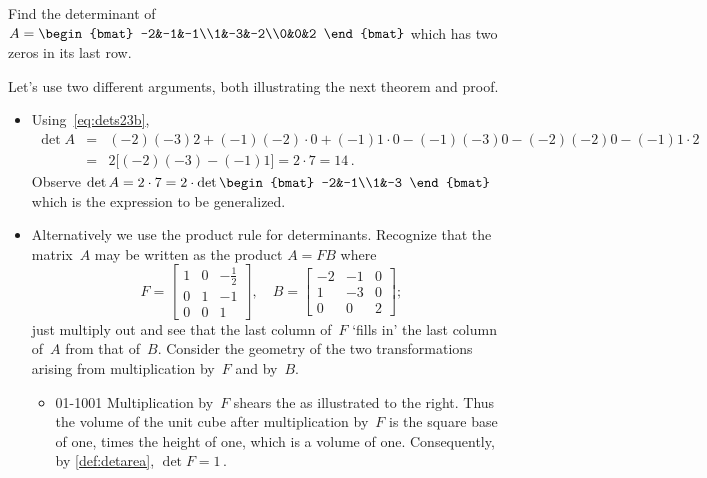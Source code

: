 \begin{example} 
Find the determinant of 
\(A=\begin{bmat} -2&-1&-1\\1&-3&-2\\0&0&2 \end{bmat}\)
which has two zeros in its last row.
\begin{solution} Let's use two different arguments, both illustrating the next theorem and proof.
\begin{itemize}
\item Using~\eqref{eq:dets23b},
\begin{eqnarray*}
\det A&=& (-2)(-3)2+(-1)(-2)\cdot0+(-1)1\cdot0
-(-1)(-3)0-(-2)(-2)0-(-1)1\cdot2
\\&=&2\big[(-2)(-3)-(-1)1\big]=2\cdot7=14\,.
\end{eqnarray*}
Observe \(\det A=2\cdot7=2\cdot\det\begin{bmat} -2&-1\\1&-3 \end{bmat}\) which is the expression to be generalized.

\item Alternatively we use the product rule for determinants. Recognize that the matrix~\(A\) may be written as the product \(A=FB\) where
\begin{equation*}
F=\begin{bmatrix} 1&0&-\frac12\\0&1&-1\\0&0&1 \end{bmatrix},
\quad B=\begin{bmatrix} -2&-1&0\\1&-3&0\\0&0&2 \end{bmatrix};
\end{equation*}
just multiply out and see that the last column of~\(F\) `fills in' the last column of~\(A\) from that of~\(B\).
Consider the geometry of the two transformations arising from multiplication by~\(F\) and by~\(B\).
\begin{itemize}

\item 
\begin{figbox}{01{-1}001}
Multiplication by~\(F\) shears the  as illustrated to the right.
Thus the volume of the unit cube after multiplication by~\(F\) is the square base of  one, times the height of one, which is a volume of one.
Consequently, by \cref{def:detarea}, \(\det F=1\)\,.
\end{figbox}



\end{itemize}
\end{itemize}
\end{solution}
\end{example}
